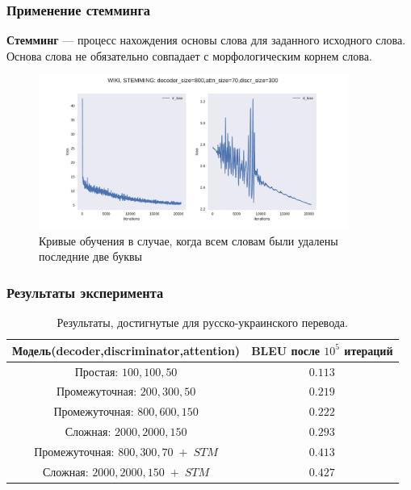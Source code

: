 \documentclass[10pt,pdf,hyperref={unicode}]{beamer}
\begin{document}
\begin{frame}
	\frametitle{Применение стемминга} 
	\begin{center}
		
		\textbf{Стемминг} — процесс нахождения основы слова для заданного исходного слова. Основа слова не обязательно совпадает с морфологическим корнем слова.
		
		\begin{figure}[h]
			\centering
			\includegraphics[width=0.9\textwidth]{WIKI,decoder_size=800,attn_size=70,discr_size=300.pdf}
			\caption{Кривые обучения в случае, когда всем словам были удалены последние две буквы}
		\end{figure}
		
	\end{center}
\end{frame}

\begin{frame}
	\frametitle{Результаты эксперимента} 
	\begin{center}
	
	\begin{table}[H]
		\caption{\label{tab:canonsummary}Результаты, достигнутые для русско-украинского перевода.}
		\begin{center}
			\begin{tabular}{|c|c|}
				\hline
				Модель(decoder,discriminator,attention) & BLEU после $10^5$ итераций \\
				\hline
				Простая: $100, 100, 50$ & $0.113$ \\
				Промежуточная: $200, 300, 50$ & $0.219$ \\
				Промежуточная: $800, 600, 150$ & $0.222$ \\
				Сложная: $2000, 2000, 150$ & \underline{ $0.293$ } \\
				\hline
				Промежуточная: $800, 300, 70 \; + \; STM$ & $0.413$ \\
				Сложная: $2000, 2000, 150 \; + \; STM$ & $0.427$ \\
				\hline
	
			\end{tabular}
		\end{center}
	\end{table} 
		
	\end{center}
\end{frame}
\end{document}

